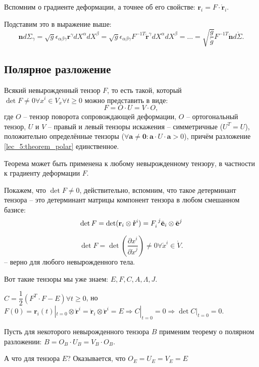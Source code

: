 Вспомним о градиенте деформации, а точнее об его свойстве: $\mathbf{r}_i = F\cdot\mathring{\mathbf{r}}_i$.

Подставим это в выражение выше:
\[
  \mathbf{n} d\Sigma_\gamma
  = \sqrt{g} \epsilon_{\alpha\beta\gamma} \mathbf{r}^\gamma dX^\alpha dX^\beta
  = \sqrt{g} \epsilon_{\alpha\beta\gamma} F^{-1T} \mathring{\mathbf{r}}^\gamma dX^\alpha dX^\beta
  = \dots
  = \sqrt{\dfrac{g}{\mathring{g}}} F^{-1T} \mathring{\mathbf{n}} d\mathring{\Sigma}.
\]


\subsection{Полярное разложение}

\begin{theorem}
  Всякий невырожденный тензор $F$, то есть такой, который $\det F \neq 0 \forall x^i \in V_x \forall t \geqslant 0$ можно представить в виде:
  \begin{equation}\label{lec_5:theorem_polar}
    F = O\cdot U = V\cdot O,
  \end{equation}
  где $O$ -- тензор поворота сопровождающей деформации, $O$ -- ортогональный тензор,
    $U$ и $V$ -- правый и левый тензоры искажения -- симметричные ($U^T = U$), положительно определённые
    тензоры ($\forall \mathbf{a} \neq \mathbf{0} : \mathbf{a} \cdot U \cdot \mathbf{a} > 0$),
    причём разложение \eqref{lec_5:theorem_polar} единственное.
\end{theorem}

\begin{remark*}
  Теорема может быть применена к любому невырожденному тензору, в частности к градиенту деформации
  $F$.
\end{remark*}

\begin{remark*}
  Покажем, что $\det F \neq 0$, действительно, вспомним, что такое детерминант тензора --
  это детерминант матрицы компонент тензора в любом смешанном базисе:
  \[
    \det F = \det (\mathbf{r}_i \otimes \mathring{\mathbf{r}}^i)
    = \tensor{F}{_i^j} \bar{\mathbf{e}}_i \otimes \bar{\mathbf{e}}^j %
  \]

  \[
    \det F = \det \left( \dfrac{\partial x^i}{\partial \mathring{x}^j}  \right) \neq 0 
    \forall \mathring{x}^i \in \mathring{V}.
  \]
  -- верно для любого невырожденного тела.
\end{remark*}

\begin{remark*}
  Вот такие тензоры мы уже знаем: $E, F, C, A, \Lambda, J$.

  $C = \dfrac{1}{2} \left( F^T \cdot F - E \right) \forall t \geqslant 0$, но $F(0) = \mathbf{r}_i(t) |_{t=0} \otimes \mathring{\mathbf{r}}^i = \mathring{\mathbf{r}}_i \otimes \mathring{\mathbf{r}}^i = E \Rightarrow C|_{t=0} = 0 \Rightarrow \det C |_{t=0} = 0$.

  Пусть для некоторого невырожденного тензора $B$ применим теорему о полярном разложении:
  $B = O_B \cdot U_B = V_B \cdot O_B$.

  А что для тензора $E$? Оказывается, что $O_E = U_E = V_E = E$
\end{remark*}

